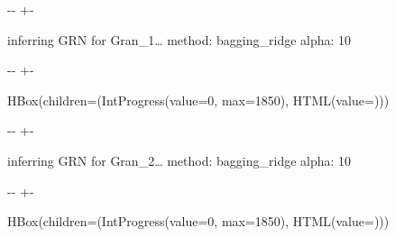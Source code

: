 \documentclass[letterpaper,10pt,english]{sphinxmanual}
\newlength\nbsphinxcodecellspacing
\begin{document}
%
{
\kern-\sphinxverbatimsmallskipamount\kern-\baselineskip
\kern+\FrameHeightAdjust\kern-\fboxrule
\vspace{\nbsphinxcodecellspacing}
%
\begin{sphinxVerbatim}[commandchars=\\\{\}]

inferring GRN for Gran\_1{\ldots}
method: bagging\_ridge
alpha: 10
\end{sphinxVerbatim}
}
\relax

{

\kern-\sphinxverbatimsmallskipamount\kern-\baselineskip
\kern+\FrameHeightAdjust\kern-\fboxrule
\vspace{\nbsphinxcodecellspacing}

%
\begin{sphinxVerbatim}[commandchars=\\\{\}]
HBox(children=(IntProgress(value=0, max=1850), HTML(value=\PYGZsq{}\PYGZsq{})))
\end{sphinxVerbatim}
}



%
{
\kern-\sphinxverbatimsmallskipamount\kern-\baselineskip
\kern+\FrameHeightAdjust\kern-\fboxrule
\vspace{\nbsphinxcodecellspacing}
%
\begin{sphinxVerbatim}[commandchars=\\\{\}]

inferring GRN for Gran\_2{\ldots}
method: bagging\_ridge
alpha: 10
\end{sphinxVerbatim}
}
\relax

{

\kern-\sphinxverbatimsmallskipamount\kern-\baselineskip
\kern+\FrameHeightAdjust\kern-\fboxrule
\vspace{\nbsphinxcodecellspacing}

%
\begin{sphinxVerbatim}[commandchars=\\\{\}]
HBox(children=(IntProgress(value=0, max=1850), HTML(value=\PYGZsq{}\PYGZsq{})))
\end{sphinxVerbatim}
}
\end{document}
